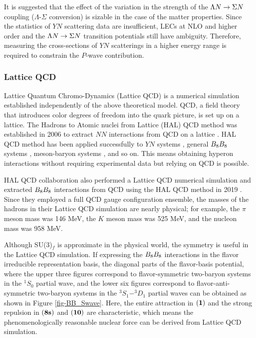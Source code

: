 It is suggested that the effect of the variation in the strength of the $\Lambda N\to\Sigma N$ coupling ($\Lambda$-$\Sigma$ conversion) is sizable in the case of the matter properties. %
Since the statistics of $YN$ scattering data are insufficient, LECs at NLO and higher order and the $\Lambda N\to\Sigma N$ transition potentials still have ambiguity. Therefore, measuring the cross-sections of $YN$ scatterings in a higher energy range is required to constrain the $P$-wave contribution. %

\subsubsection{Lattice QCD}
\label{sec-LatticeQCD}
Lattice Quantum Chromo-Dynamics (Lattice QCD) is a numerical simulation established independently of the above theoretical model. QCD, a field theory that introduces color degrees of freedom into the quark picture, is set up on a lattice. The Hadrons to Atomic nuclei from Lattice (HAL) QCD method was established in 2006 to extract $NN$ interactions from QCD on a lattice \cite{QCD-2006}. HAL QCD method has been applied successfully to $YN$ systems \cite{QCD-YN}, general $B_{8}B_{8}$ systems \cite{QCD-BB}, meson-baryon systems \cite{QCD-MB}, and so on. This means obtaining hyperon interactions without requiring experimental data but relying on QCD is possible. 

HAL QCD collaboration also performed a Lattice QCD numerical simulation and extracted $B_{8}B_{8}$ interactions from QCD using the HAL QCD method in 2019 \cite{QCD-2019}. Since they employed a full QCD gauge configuration ensemble, the masses of the hadrons in their Lattice QCD simulation are nearly physical; for example, the $\pi$ meson mass was 146 MeV, the $K$ meson mass was 525 MeV, and the nucleon mass was 958 MeV. 

Although SU(3)$_f$ is approximate in the physical world, the symmetry is useful in the Lattice QCD simulation. If expressing the $B_{8}B_{8}$ interactions in the flavor irreducible representation basis, the diagonal parts of the flavor-basis potential, where the upper three figures correspond to flavor-symmetric two-baryon systems in the $^1S_0$ partial wave, and the lower six figures correspond to flavor-anti-symmetric two-baryon systems in the $^3S_1$$-$$^3D_1$ partial waves can be obtained as shown in Figure \ref{fig-BB_Swave}. Here, the entire attraction in ${\bf (1)}$ and the strong repulsion in ${\bf (8s)}$ and ${\bf (10)}$ are characteristic, which means the phenomenologically reasonable nuclear force can be derived from Lattice QCD simulation.



